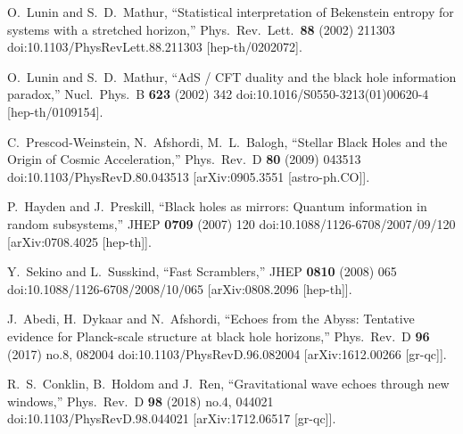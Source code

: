 \documentclass[12pt]{article}
\begin{document}
\begin{thebibliography}{99}
  O.~Lunin and S.~D.~Mathur,
  ``Statistical interpretation of Bekenstein entropy for systems with a stretched horizon,''
  Phys.\ Rev.\ Lett.\  {\bf 88} (2002) 211303
  doi:10.1103/PhysRevLett.88.211303
  [hep-th/0202072].
  
  O.~Lunin and S.~D.~Mathur,
  ``AdS / CFT duality and the black hole information paradox,''
  Nucl.\ Phys.\ B {\bf 623} (2002) 342
  doi:10.1016/S0550-3213(01)00620-4
  [hep-th/0109154].

  C.~Prescod-Weinstein, N.~Afshordi, M.~L.~Balogh,
  ``Stellar Black Holes and the Origin of Cosmic Acceleration,''
  Phys.\ Rev.\ D {\bf 80} (2009) 043513
  doi:10.1103/PhysRevD.80.043513
  [arXiv:0905.3551 [astro-ph.CO]].

  P.~Hayden and J.~Preskill,
  ``Black holes as mirrors: Quantum information in random subsystems,''
  JHEP {\bf 0709} (2007) 120
  doi:10.1088/1126-6708/2007/09/120
  [arXiv:0708.4025 [hep-th]].

  Y.~Sekino and L.~Susskind,
  ``Fast Scramblers,''
  JHEP {\bf 0810} (2008) 065
  doi:10.1088/1126-6708/2008/10/065
  [arXiv:0808.2096 [hep-th]].

  J.~Abedi, H.~Dykaar and N.~Afshordi,
  ``Echoes from the Abyss: Tentative evidence for Planck-scale structure at black hole horizons,''
  Phys.\ Rev.\ D {\bf 96} (2017) no.8,  082004
  doi:10.1103/PhysRevD.96.082004
  [arXiv:1612.00266 [gr-qc]].
  
  R.~S.~Conklin, B.~Holdom and J.~Ren,
  ``Gravitational wave echoes through new windows,''
  Phys.\ Rev.\ D {\bf 98} (2018) no.4,  044021
  doi:10.1103/PhysRevD.98.044021
  [arXiv:1712.06517 [gr-qc]].
  

\end{thebibliography}
\end{document}
